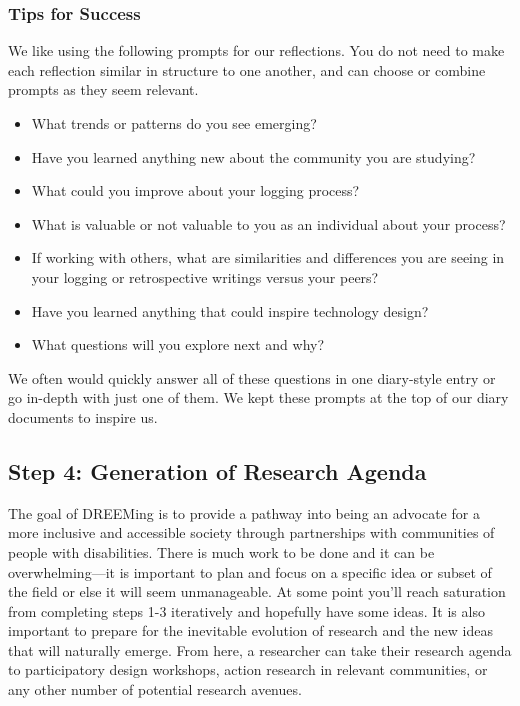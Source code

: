 \subsubsection{Tips for Success}
We like using the following prompts for our reflections. You do not need to make each reflection similar in structure to one another, and can choose or combine prompts as they seem relevant. 
\begin{itemize}
\item What trends or patterns do you see emerging?
\item Have you learned anything new about the community you are studying?
\item What could you improve about your logging process?
\item What is valuable or not valuable to you as an individual about your process? 
\item If working with others, what are similarities and differences you are seeing in your logging or retrospective writings versus your peers?
\item Have you learned anything that could inspire technology design?
\item What questions will you explore next and why? 
\end{itemize}
We often would quickly answer all of these questions in one diary-style entry or go in-depth with just one of them. We kept these prompts at the top of our diary documents to inspire us.

\subsection{Step 4: Generation of Research Agenda}
The goal of DREEMing is to provide a pathway into being an advocate for a more inclusive and accessible society through partnerships with communities of people with disabilities. There is much work to be done and it can be overwhelming—it is important to plan and focus on a specific idea or subset of the field or else it will seem unmanageable. At some point you'll reach saturation from completing steps 1-3 iteratively and hopefully have some ideas. It is also important to prepare for the inevitable evolution of research and the new ideas that will naturally emerge. From here, a researcher can take their research agenda to participatory design workshops, action research in relevant communities, or any other number of potential research avenues.


